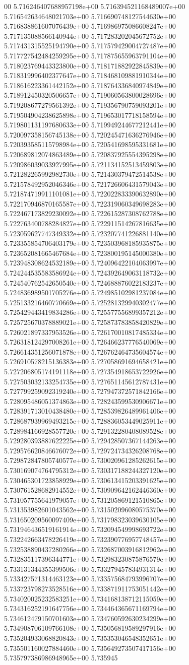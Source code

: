 00	5.716246407688957198e+00	5.716394521168489007e+00	5.716542634648021703e+00	5.716690748127544630e+00	5.716838861607076439e+00	5.716986975086608247e+00	5.717135088566140944e+00	5.717283202045672752e+00	5.717431315525194790e+00	5.717579429004727487e+00	5.717727542484259295e+00	5.717875655963791104e+00	5.718023769443323800e+00	5.718171882922845839e+00	5.718319996402377647e+00	5.718468109881910344e+00	5.718616223361442152e+00	5.718764336840974849e+00	5.718912450320506657e+00	5.719060563800028696e+00	5.719208677279561392e+00	5.719356790759093201e+00	5.719504904238625898e+00	5.719653017718158594e+00	5.719801131197680633e+00	5.719949244677212441e+00	5.720097358156745138e+00	5.720245471636276946e+00	5.720393585115798984e+00	5.720541698595331681e+00	5.720689812074863489e+00	5.720837925554395298e+00	5.720986039033927995e+00	5.721134152513459803e+00	5.721282265992982730e+00	5.721430379472514538e+00	5.721578492952046346e+00	5.721726606431579043e+00	5.721874719911101081e+00	5.722022833390632890e+00	5.722170946870165587e+00	5.722319060349698283e+00	5.722467173829230092e+00	5.722615287308762788e+00	5.722763400788284827e+00	5.722911514267816635e+00	5.723059627747349332e+00	5.723207741226881140e+00	5.723355854706403179e+00	5.723503968185935875e+00	5.723652081665467684e+00	5.723800195145000380e+00	5.723948308624532189e+00	5.724096422104063997e+00	5.724244535583586924e+00	5.724392649063118732e+00	5.724540762542650540e+00	5.724688876022183237e+00	5.724836989501705276e+00	5.724985102981237084e+00	5.725133216460770669e+00	5.725281329940302477e+00	5.725429443419834286e+00	5.725577556899357212e+00	5.725725670378889021e+00	5.725873783858420829e+00	5.726021897337953526e+00	5.726170010817485334e+00	5.726318124297008261e+00	5.726466237776540069e+00	5.726614351256071878e+00	5.726762464735604574e+00	5.726910578215136383e+00	5.727058691694658421e+00	5.727206805174191118e+00	5.727354918653722926e+00	5.727503032133254735e+00	5.727651145612787431e+00	5.727799259092319240e+00	5.727947372571842166e+00	5.728095486051374863e+00	5.728243599530906671e+00	5.728391713010438480e+00	5.728539826489961406e+00	5.728687939969493215e+00	5.728836053449025911e+00	5.728984166928557720e+00	5.729132280408089528e+00	5.729280393887622225e+00	5.729428507367144263e+00	5.729576620846676072e+00	5.729724734326208768e+00	5.729872847805740577e+00	5.730020961285262615e+00	5.730169074764795312e+00	5.730317188244327120e+00	5.730465301723858929e+00	5.730613415203391625e+00	5.730761528682914552e+00	5.730909642162446360e+00	5.731057755641979057e+00	5.731205869121510865e+00	5.731353982601043562e+00	5.731502096080575370e+00	5.731650209560097409e+00	5.731798323039630105e+00	5.731946436519161914e+00	5.732094549998693722e+00	5.732242663478226419e+00	5.732390776957748457e+00	5.732538890437280266e+00	5.732687003916812962e+00	5.732835117396344771e+00	5.732983230875876579e+00	5.733131344355399506e+00	5.733279457834931314e+00	5.733427571314463123e+00	5.733575684793996707e+00	5.733723798273528516e+00	5.733871911753051442e+00	5.734020025232583251e+00	5.734168138712115059e+00	5.734316252191647756e+00	5.734464365671169794e+00	5.734612479150701603e+00	5.734760592630234299e+00	5.734908706109766108e+00	5.735056819589297916e+00	5.735204933068820843e+00	5.735353046548352651e+00	5.735501160027884460e+00	5.735649273507417156e+00	5.735797386986948965e+00	5.735945